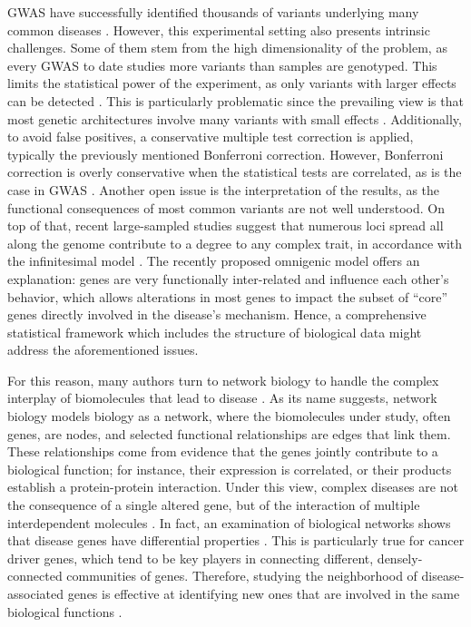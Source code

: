 \documentclass[10pt,letterpaper]{article}
\begin{document}
GWAS have successfully identified thousands of variants underlying many common diseases \cite{buniello_nhgri-ebi_2019}. However, this experimental setting also presents intrinsic challenges. Some of them stem from the high dimensionality of the problem, as every GWAS to date studies more variants than samples are genotyped. This limits the statistical power of the experiment, as only variants with larger effects can be detected \cite{visscher_10_2017}. This is particularly problematic since the prevailing view is that most genetic architectures involve many variants with small effects \cite{visscher_10_2017}. Additionally, to avoid false positives, a conservative multiple test correction is applied, typically the previously mentioned Bonferroni correction. However, Bonferroni correction is overly conservative when the statistical tests are correlated, as is the case in GWAS \cite{wang_statistical_2018}. Another open issue is the interpretation of the results, as the functional consequences of most common variants are not well understood. On top of that, recent large-sampled studies suggest that numerous loci spread all along the genome contribute to a degree to any complex trait, in accordance with the infinitesimal model \cite{barton_infinitesimal_2017}. The recently proposed omnigenic model \cite{boyle_expanded_2017} offers an explanation: genes are very functionally inter-related and influence each other's behavior, which allows alterations in most genes to impact the subset of ``core'' genes directly involved in the disease's mechanism. Hence, a comprehensive statistical framework which includes the structure of biological data might address the aforementioned issues.

For this reason, many authors turn to network biology to handle the complex interplay of biomolecules that lead to disease \cite{furlong_human_2013}. As its name suggests, network biology models biology as a network, where the biomolecules under study, often genes, are nodes, and selected functional relationships are edges that link them. These relationships come from evidence that the genes jointly contribute to a biological function; for instance, their expression is correlated, or their products establish a protein-protein interaction. Under this view, complex diseases are not the consequence of a single altered gene, but of the interaction of multiple interdependent molecules \cite{barabasi_network_2011}. In fact, an examination of biological networks shows that disease genes have differential properties \cite{barabasi_network_2011,pinero_uncovering_2016}. This is particularly true for cancer driver genes, which tend to be key players in connecting different, densely-connected communities of genes. Therefore, studying the neighborhood of disease-associated genes is effective at identifying new ones that are involved in the same biological functions \cite{huang_systematic_2018}. 
\end{document}
